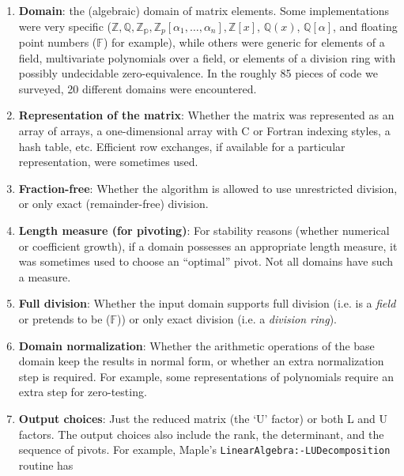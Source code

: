 \documentclass{elsart}
\newcommand{\floats}{\mathbb{F}}
\begin{document}
\begin{enumerate}
    \item \textbf{Domain}: the (algebraic) domain of matrix
        elements.  Some implementations were very specific
        ($\mathbb{Z}, \mathbb{Q}, \mathbb{Z_p}, 
        \mathbb{Z}_p\left[\alpha_1,\ldots,\alpha_n\right], 
        \mathbb{Z}\left[x\right]$, $\mathbb{Q}\left(x\right)$, 
        $\mathbb{Q}\left[\alpha\right]$, and floating point numbers 
        ($\floats$) for 
        example), while others were generic for elements of a field,
        multivariate polynomials over a field, or elements of a division ring
        with possibly undecidable zero-equivalence.  In the roughly 85 pieces
        of code we surveyed, 20 different domains were encountered.
    \item \textbf{Representation of the matrix}: Whether the matrix
        was represented as an array of arrays, a
        one-dimensional array with C or Fortran indexing styles, 
        a hash table, etc. Efficient row exchanges, if available for a
        particular representation, were sometimes used.
    \item \textbf{Fraction-free}: Whether the 
        algorithm is allowed to use unrestricted division, or only
        exact (remainder-free) division.
    \item \textbf{Length measure (for pivoting)}:  For stability reasons
        (whether numerical or coefficient growth), if a domain 
        possesses an appropriate length measure, it was sometimes used to
        choose an ``optimal'' pivot.  Not all domains have such a measure.
    \item \textbf{Full division}: Whether the input domain supports full
        division (i.e. is a \emph{field} or pretends to be ($\floats$)) 
        or only exact division (i.e. a \emph{division ring}).
    \item \textbf{Domain normalization}: Whether the arithmetic operations
        of the base domain keep the results in normal form, or whether
        an extra normalization step is required.  For example, some 
        representations of polynomials require an extra step for
        zero-testing.
    \item \textbf{Output choices}:  Just the reduced matrix
        (the `U' factor) or both L and U factors. The output
      choices also include
        the rank, the determinant, and the sequence of 
        pivots.  For example, Maple's
        \texttt{LinearAlgebra:\hyp LUDecomposition} routine has

\end{enumerate}
\end{document}
